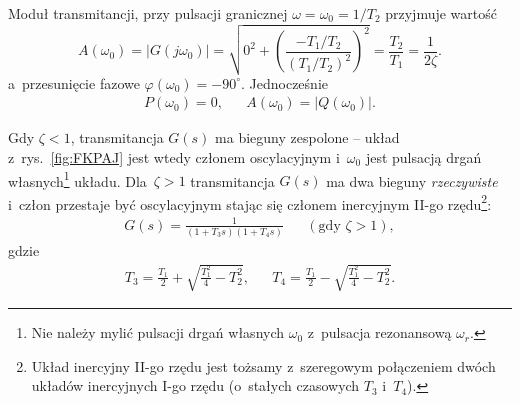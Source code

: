 \documentclass[paper=a4,DIV=12]{lpas}
\newcommand{\degree}{^{\circ}}
\begin{document}
\begin{appendices}
  Moduł transmitancji, przy pulsacji granicznej $\omega = \omega_0 = 1/T_2$
  przyjmuje wartość
  \begin{equation}
    A(\omega_0) = |G(j\omega_0)|
                = \sqrt{0^2 + \left(\frac{-T_1/T_2}{(T_1/T_2)^2}\right)^2}
                = \frac{T_2}{T_1} = \frac{1}{2 \zeta}.
    \label{eq:2E47P}
  \end{equation}
  a~przesunięcie fazowe $\varphi(\omega_0) = -90\degree$. Jednocześnie
  \begin{equation}
    \begin{aligned}
      & P(\omega_0) = 0, && A(\omega_0) = \left|Q(\omega_0)\right|. &
    \end{aligned}
    \label{eq:XGWVE}
  \end{equation}

  Gdy $\zeta < 1$, transmitancja $G(s)$ ma bieguny zespolone -- układ
  z~rys.~\ref{fig:FKPAJ} jest wtedy członem oscylacyjnym i~$\omega_0$ jest
  pulsacją drgań własnych\footnote{Nie należy mylić pulsacji drgań
  własnych $\omega_0$ z~pulsacja rezonansową $\omega_r$.
  } układu. Dla~$\zeta>1$ transmitancja $G(s)$ ma dwa bieguny {\em rzeczywiste}
  i~człon przestaje być oscylacyjnym stając się członem inercyjnym II-go
  rzędu\footnote{Układ inercyjny II-go rzędu jest tożsamy z~szeregowym
  połączeniem dwóch układów inercyjnych I-go rzędu (o~stałych czasowych $T_3$
  i~$T_4$).}:
  \begin{equation}
    \begin{aligned}
      &
      G(s) = \frac{1}{(1 + T_3 s)(1 + T_4 s)}
      &&
      (\text{gdy } \zeta > 1),
      &
    \end{aligned}
  \end{equation}
  gdzie
  \begin{equation}
    \begin{aligned}
      &
      T_3 = \frac{T_1}{2} + \sqrt{\frac{T_1^2}{4} - T_2^2},
      &&
      T_4 = \frac{T_1}{2} - \sqrt{\frac{T_1^2}{4} - T_2^2}.
      &
    \end{aligned}
  \end{equation}


\end{appendices}
\end{document}

